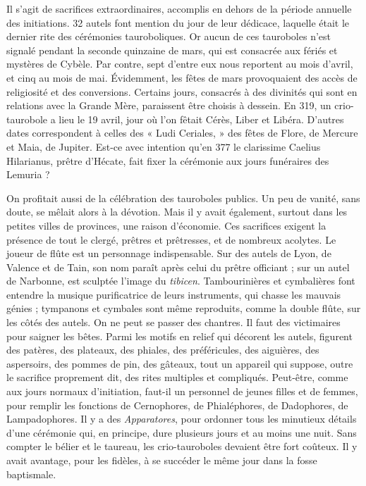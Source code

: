 \documentclass[a4paper, 11pt, oneside, polutonikogreek, french]{article}
\begin{document}
Il s'agit de sacrifices extraordinaires, accomplis en dehors de la période annuelle des initiations. 32 autels font mention du jour de leur dédicace, laquelle était le dernier rite des cérémonies tauroboliques. Or aucun de ces tauroboles n'est signalé pendant la seconde quinzaine de mars, qui est consacrée aux fériés et mystères de Cybèle. Par contre, sept d'entre eux nous reportent au mois d'avril, et cinq au mois de mai. Évidemment, les fêtes de mars provoquaient des accès de religiosité et des conversions. Certains jours, consacrés à des divinités qui sont en relations avec la Grande Mère, paraissent être choisis à dessein. En 319, un crio-taurobole a lieu le 19 avril, jour où l'on fêtait Cérès, Liber et Libéra. D'autres dates correspondent à celles des « Ludi Ceriales, » des fêtes de Flore, de Mercure et Maia, de Jupiter. Est-ce avec intention qu'en 377 le clarissime Caelius Hilarianus, prêtre d'Hécate, fait fixer la cérémonie aux jours funéraires des Lemuria ?

On profitait aussi de la célébration des tauroboles publics. Un peu de vanité, sans doute, se mêlait alors à la dévotion. Mais il y avait également, surtout dans les petites villes de provinces, une raison d'économie. Ces sacrifices exigent la présence de tout le clergé, prêtres et prêtresses, et de nombreux acolytes. Le joueur de flûte est un personnage indispensable. Sur des autels de Lyon, de Valence et de Tain, son nom paraît après celui du prêtre officiant ; sur un autel de Narbonne, est sculptée l'image du \emph{tibicen}. Tambourinières et cymbalières font entendre la musique purificatrice de leurs instruments, qui chasse les mauvais génies ; tympanons et cymbales sont même reproduits, comme la double flûte, sur les côtés des autels. On ne peut se passer des chantres. Il faut des victimaires pour saigner les bêtes. Parmi les motifs en relief qui décorent les autels, figurent des patères, des plateaux, des phiales, des préféricules, des aiguières, des aspersoirs, des pommes de pin, des gâteaux, tout un appareil qui suppose, outre le sacrifice proprement dit, des rites multiples et compliqués. Peut-être, comme aux jours normaux d'initiation, faut-il un personnel de jeunes filles et de femmes, pour remplir les fonctions de Cernophores, de Phialéphores, de Dadophores, de Lampadophores. Il y a des \emph{Apparatores}, pour ordonner tous les minutieux détails d'une cérémonie qui, en principe, dure plusieurs jours et au moins une nuit. Sans compter le bélier et le taureau, les crio-tauroboles devaient être fort coûteux. Il y avait avantage, pour les fidèles, à se succéder le même jour dans la fosse baptismale.
\end{document}
